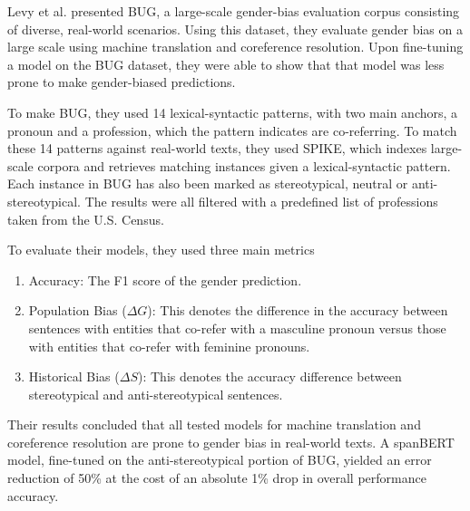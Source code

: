 \documentclass[10pt,twocolumn,letterpaper]{article}
\begin{document}
Levy et al. \cite{bug-dataset} presented BUG, a large-scale gender-bias evaluation corpus consisting of diverse, real-world scenarios.
Using this dataset, they evaluate gender bias on a large scale using machine translation and coreference resolution.
Upon fine-tuning a model on the BUG dataset, they were able to show that that model was less prone to make gender-biased predictions.

To make BUG, they used 14 lexical-syntactic patterns, with two main anchors, a pronoun and a profession, which the pattern indicates are co-referring.
To match these 14 patterns against real-world texts, they used SPIKE, which indexes large-scale corpora and retrieves matching instances given a lexical-syntactic pattern.
Each instance in BUG has also been marked as stereotypical, neutral or anti-stereotypical.
The results were all filtered with a predefined list of professions taken from the U.S. Census.

To evaluate their models, they used three main metrics
\begin{enumerate}
    \item Accuracy: The F1 score of the gender prediction.
    \item Population Bias ($\Delta G$): This denotes the difference in the accuracy between sentences with entities that co-refer with a masculine pronoun versus those with entities that co-refer with feminine pronouns.
    \item Historical Bias ($\Delta S$): This denotes the accuracy difference between stereotypical and anti-stereotypical sentences.
\end{enumerate}

Their results concluded that all tested models for machine translation and coreference resolution are prone to gender bias in real-world texts.
A spanBERT model, fine-tuned on the anti-stereotypical portion of BUG, yielded an error reduction of 50\% at the cost of an absolute 1\% drop in overall performance accuracy.
\end{document}
